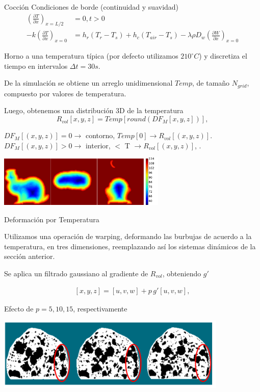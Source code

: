 \documentclass[spanish]{beamer}
\begin{document}
\begin{frame}{Cocción}
Condiciones de borde (continuidad y suavidad)
\begin{align*}
\left ( \frac{\partial T}{\partial x} \right )_{x=L/2} &= 0 , t > 0 \\
-k \left ( \frac{\partial T}{\partial x} \right )_{x=0} &= h_{r}(T_{r}-T_{s}) + h_{c}(T_{air}-T_{s}) - \lambda \rho D_{w} \left (\frac{\partial W}{\partial x} \right )_{x=0}
\end{align*}
%

\end{frame}

\begin{frame}
Horno a una temperatura típica (por defecto utilizamos $210^{\circ}C$) y discretiza el tiempo en intervalos $\Delta t = 30s$.


De la simulación se obtiene un arreglo unidimensional $Temp$, de tamaño $N_{grid}$, compuesto por valores de temperatura.

Luego, obtenemos una distribución 3D de la temperatura
\begin{equation*}
\displaystyle R_{vol}[x,y,z] = Temp[ round( DF_{M}[x,y,z] ) ], 
\end{equation*}

$DF_{M}[(x,y,z)] = 0 \rightarrow$ contorno, $Temp[0] \rightarrow R_{vol}[(x,y,z)]$.
$DF_{M}[(x,y,z)] > 0 \rightarrow$ interior, $<$ T  $\rightarrow R_{vol}[(x,y,z)]$, .

\centerline{\includegraphics[width=8cm]{../figures/tempsbunny}}
\end{frame}

\begin{frame}{Deformación por Temperatura}

Utilizamos una operación de warping, deformando las burbujas de acuerdo a la temperatura, en tres dimensiones, reemplazando así los sistemas dinámicos de la sección anterior.

Se aplica un filtrado gaussiano al gradiente de $R_{vol}$, obteniendo $g'$

\begin{align*}
\displaystyle
[x,y,z] = [u,v,w] + p\, g'[u,v,w],
\end{align*}

Efecto de $p = 5,10,15$, respectivamente
\centerline{\includegraphics[width=11cm]{../figures/parameterp}}

\end{frame}
\end{document}
